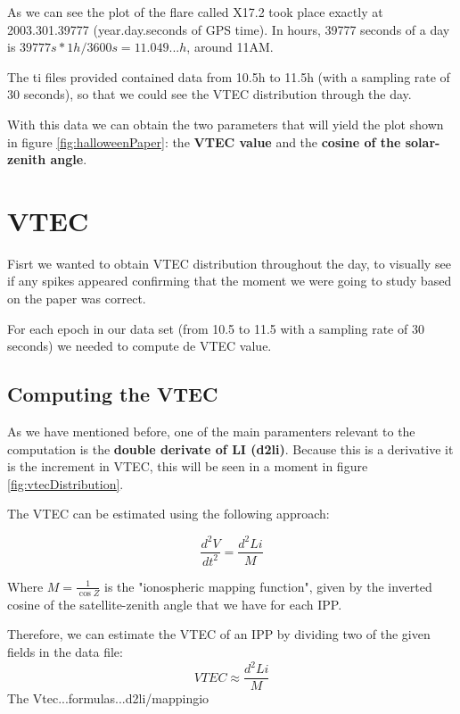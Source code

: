 As we can see the plot of the flare called X17.2 took place exactly at 2003.301.39777 (year.day.seconds of GPS time). In hours, 39777 seconds of a day is $39777s * 1h/3600s = 11.049...h$, around 11AM. 

The ti files provided contained data from 10.5h to 11.5h (with a sampling rate of 30 seconds), so that we could see the VTEC distribution through the day.

With this data we can obtain the two parameters that will yield the plot shown in figure \ref{fig:halloweenPaper}: the \textbf{VTEC value} and the \textbf{cosine of the solar-zenith angle}.

\section{VTEC}

Fisrt we wanted to obtain VTEC distribution throughout the day, to visually see if any spikes appeared confirming that the moment we were going to study based on the paper \cite{hernandez2012gnss} was correct.

For each epoch in our data set (from 10.5 to 11.5 with a sampling rate of 30 seconds) we needed to compute de VTEC value.

\subsection{Computing the VTEC}

As we have mentioned before, one of the main paramenters relevant to the computation is the \textbf{double derivate of LI (d2li)}. Because this is a derivative it is the increment in VTEC, this will be seen in a moment in figure \ref{fig:vtecDistribution}.

The VTEC can be estimated using the following approach:

\begin{equation} \label{eq:1}
	\frac{d^{2}V}{dt^{2}} = \frac{d^{2}Li}{M}
\end{equation}

Where $M=\frac{1}{\cos Z}$ is the "ionospheric mapping function", given by the inverted cosine of the satellite-zenith angle that we have for each IPP. \cite{hernandez2012gnss}

Therefore, we can estimate the VTEC of an IPP by dividing two of the given fields in the data file:
\begin{equation} \label{eq:2}
	VTEC \approx \frac{d^{2}Li}{M}
\end{equation}
The Vtec...formulas...d2li/mappingio


